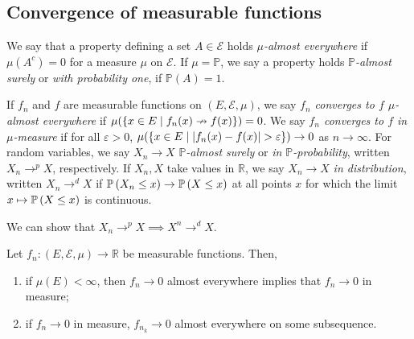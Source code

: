 \subsection{Convergence of measurable functions}
\begin{definition}
	We say that a property defining a set \( A \in \mathcal E \) holds \emph{\( \mu \)-almost everywhere} if \( \mu(A^c) = 0 \) for a measure \( \mu \) on \( \mathcal E \).
	If \( \mu = \mathbb P \), we say a property holds \emph{\( \mathbb P \)-almost surely} or \emph{with probability one}, if \( \mathbb P(A) = 1 \).
\end{definition}
\begin{definition}
	If \( f_n \) and \( f \) are measurable functions on \( (E,\mathcal E,\mu) \), we say \emph{\( f_n \) converges to \( f \) \( \mu \)-almost everywhere} if \( \mu(\qty{x \in E \mid f_n(x) \nrightarrow f(x)}) = 0 \).
	We say \emph{\( f_n \) converges to \( f \) in \( \mu \)-measure} if for all \( \varepsilon > 0 \), \( \mu(\qty{x\in E \mid \abs{f_n(x) - f(x)} > \varepsilon}) \to 0 \) as \( n \to \infty \).
	For random variables, we say \( X_n \to X \) \emph{\( \mathbb P \)-almost surely} or \emph{in \( \mathbb P \)-probability}, written \( X_n \to^p X \), respectively.
	If \( X_n, X \) take values in \( \mathbb R \), we say \( X_n \to X \) \emph{in distribution}, written \( X_n \to^d X \) if \( \mathbb{P}\left({X_n \leq x}\right) \to \mathbb{P}\left({X \leq x}\right) \) at all points \( x \) for which the limit \( x \mapsto \mathbb{P}\left({X \leq x}\right) \) is continuous.
\end{definition}
We can show that \( X_n \to^p X \implies X^n \to^d X \).
\begin{theorem}
	Let \( f_n \colon (E,\mathcal E,\mu) \to \mathbb R \) be measurable functions.
	Then,
	\begin{enumerate}
		\item if \( \mu(E) < \infty \), then \( f_n \to 0 \) almost everywhere implies that \( f_n \to 0 \) in measure;
		\item if \( f_n \to 0 \) in measure, \( f_{n_k} \to 0 \) almost everywhere on some subsequence.
	\end{enumerate}
\end{theorem}
